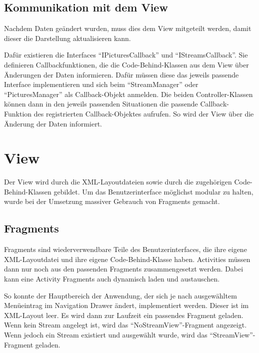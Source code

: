 \subsection{Kommunikation mit dem View}

Nachdem Daten geändert wurden, muss dies dem View mitgeteilt werden, damit dieser die Darstellung aktualisieren kann.

Dafür existieren die Interfaces \enquote{IPicturesCallback} und \enquote{IStreamsCallback}. Sie definieren Callbackfunktionen, die die Code-Behind-Klassen aus dem View über Änderungen der Daten informieren. Dafür müssen diese das jeweils passende Interface implementieren und sich beim \enquote{StreamManager} oder \enquote{PicturesManager} als Callback-Objekt anmelden. Die beiden Controller-Klassen können dann in den jeweils passenden Situationen die passende Callback-Funktion des registrierten Callback-Objektes aufrufen. So wird der View über die Änderung der Daten informiert.

\section{View}

Der View wird durch die XML-Layoutdateien sowie durch die zugehörigen Code-Behind-Klassen gebildet. Um das Benutzerinterface möglichst modular zu halten, wurde bei der Umsetzung massiver Gebrauch von Fragments gemacht.

\subsection{Fragments}

Fragments sind wiederverwendbare Teile des Benutzerinterfaces, die ihre eigene XML-Layoutdatei und ihre eigene Code-Behind-Klasse haben. Activities müssen dann nur noch aus den passenden Fragments zusammengesetzt werden. Dabei kann eine Activity Fragments auch dynamisch laden und austauschen. 

So konnte der Hauptbereich der Anwendung, der sich je nach ausgewähltem Menüeintrag im Navigation Drawer ändert, implementiert werden. Dieser ist im XML-Layout leer. Es wird dann zur Laufzeit ein passendes Fragment geladen. 
Wenn kein Stream angelegt ist, wird das \enquote{NoStreamView}-Fragment angezeigt. Wenn jedoch ein Stream existiert und ausgewählt wurde, wird das \enquote{StreamView}-Fragment geladen.

